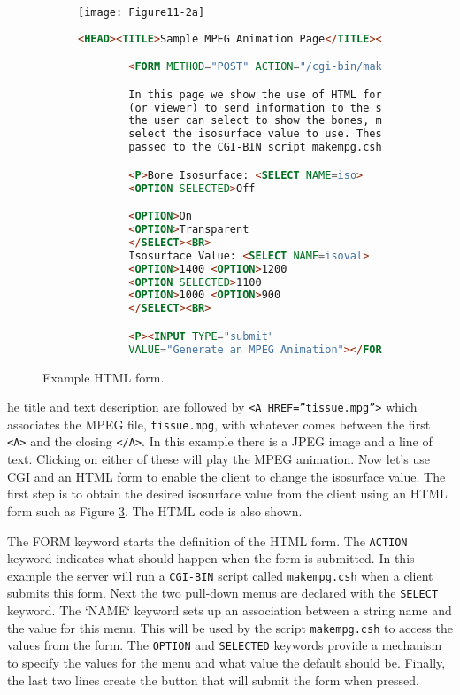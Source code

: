 \begin{figure}[htb]
    \centering
	\begin{subfigure}[h]{0.76\linewidth}
		\texttt{[image: Figure11-2a]}
		\captionsetup{justification=centering}
		\caption*{}
		\label{fig:Figure11-2a}
	\end{subfigure}
	\hfill
	\begin{subfigure}[h]{0.98\linewidth}
       \begin{lstlisting}[language=HTML,  caption={}, numbers=none, frame=none]
        <HEAD><TITLE>Sample MPEG Animation Page</TITLE></HEAD>

        <FORM METHOD="POST" ACTION="/cgi-bin/makempg.csh">

        In this page we show the use of HTML forms to allow the client
        (or viewer) to send information to the server. In this example
        the user can select to show the bones, make them transparent and
        select the isosurface value to use. These parameters then get
        passed to the CGI-BIN script makempg.csh</P>

        <P>Bone Isosurface: <SELECT NAME=iso>
        <OPTION SELECTED>Off

        <OPTION>On
        <OPTION>Transparent
        </SELECT><BR>
        Isosurface Value: <SELECT NAME=isoval>
        <OPTION>1400 <OPTION>1200
        <OPTION SELECTED>1100
        <OPTION>1000 <OPTION>900
        </SELECT><BR>

        <P><INPUT TYPE="submit"
        VALUE="Generate an MPEG Animation"></FORM></P>
        \end{lstlisting}
        \label{fig:Figure11-2b}
	\end{subfigure}
	\caption{Example HTML form.}\label{fig:Figure11-2}
\end{figure}

he title and text description are followed by \texttt{<A HREF=''tissue.mpg''>} which associates the MPEG file, \texttt{tissue.mpg}, with whatever comes between the first \texttt{<A>} and the closing \texttt{</A>}. In this example there is a JPEG image and a line of text. Clicking on either of these will play the MPEG animation.
Now let's use CGI and an HTML form to enable the client to change the isosurface value. The first step is to obtain the desired isosurface value from the client using an HTML form such as Figure \ref{fig:Figure11-2}. The HTML code is also shown.

The FORM keyword starts the definition of the HTML form. The \texttt{ACTION} keyword indicates what should happen when the form is submitted. In this example the server will run a \texttt{CGI-BIN} script called \texttt{makempg.csh} when a client submits this form. Next the two pull-down menus are declared with the \texttt{SELECT} keyword. The `NAME` keyword sets up an association between a string name and the value for this menu. This will be used by the script \texttt{makempg.csh} to access the values from the form. The \texttt{OPTION} and \texttt{SELECTED} keywords provide a mechanism to specify the values for the menu and what value the default should be. Finally, the last two lines create the button that will submit the form when pressed.

